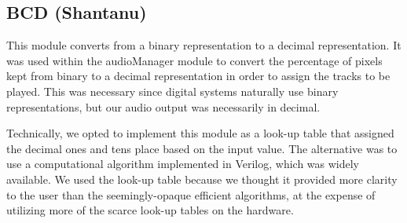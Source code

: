 \documentclass{article}
\begin{document}
\subsection{BCD (Shantanu)}
This module converts from a binary representation to a decimal representation.
It was used within the audioManager module to convert the percentage of pixels kept from binary to a decimal representation in order to assign the tracks to be played.
This was necessary since digital systems naturally use binary representations, but our audio output was necessarily in decimal.

Technically, we opted to implement this module as a look-up table that assigned the decimal ones and tens place based on the input value.
The alternative was to use a computational algorithm implemented in Verilog, which was widely available.
We used the look-up table because we thought it provided more clarity to the user than the seemingly-opaque efficient algorithms,
at the expense of utilizing more of the scarce look-up tables on the hardware.
\end{document}
